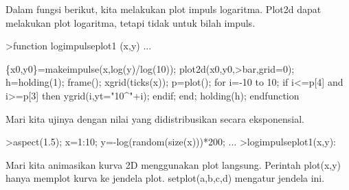 \documentclass[a4paper,10pt]{article}
\begin{document}
\begin{eulernotebook}
\begin{eulercomment}
\begin{eulercomment}
\begin{eulercomment}
\begin{eulercomment}
\begin{eulercomment}
\begin{eulercomment}
\begin{eulercomment}
\begin{eulercomment}
\begin{eulercomment}
\begin{eulercomment}
\begin{eulercomment}
\begin{eulercomment}
\begin{eulercomment}
\begin{eulercomment}
\begin{eulercomment}
Dalam fungsi berikut, kita melakukan plot impuls logaritma. Plot2d
dapat melakukan plot logaritma, tetapi tidak untuk bilah impuls.
\end{eulercomment}
\begin{eulerprompt}
>function logimpulseplot1 (x,y) ...
\end{eulerprompt}
\begin{eulerudf}
    \{x0,y0\}=makeimpulse(x,log(y)/log(10));
    plot2d(x0,y0,>bar,grid=0);
    h=holding(1);
    frame();
    xgrid(ticks(x));
    p=plot();
    for i=-10 to 10;
      if i<=p[4] and i>=p[3] then
         ygrid(i,yt="10^"+i);
      endif;
    end;
    holding(h);
  endfunction
\end{eulerudf}
\begin{eulercomment}
Mari kita ujinya dengan nilai yang didistribusikan secara
eksponensial.
\end{eulercomment}
\begin{eulerprompt}
>aspect(1.5); x=1:10; y=-log(random(size(x)))*200; ...
>logimpulseplot1(x,y):
\end{eulerprompt}
\begin{eulercomment}
Mari kita animasikan kurva 2D menggunakan plot langsung. Perintah
plot(x,y) hanya memplot kurva ke jendela plot. setplot(a,b,c,d)
mengatur jendela ini.


\end{eulercomment}
\end{eulercomment}
\end{eulercomment}
\end{eulercomment}
\end{eulercomment}
\end{eulercomment}
\end{eulercomment}
\end{eulercomment}
\end{eulercomment}
\end{eulercomment}
\end{eulercomment}
\end{eulercomment}
\end{eulercomment}
\end{eulercomment}
\end{eulercomment}
\end{eulernotebook}
\end{document}
